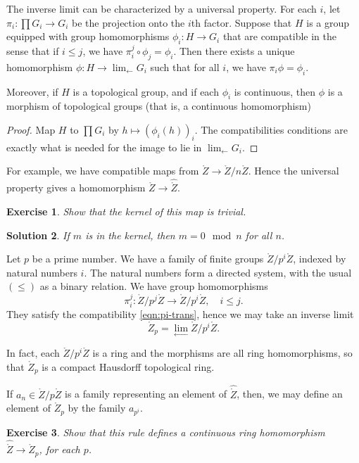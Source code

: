 \documentclass{amsart}
\newtheorem{exercise}{Exercise}
\newtheorem{solution}[exercise]{Solution}
\begin{document}
The inverse limit can be characterized by a universal property.  
For each $i$, let $\pi_i: \prod G_i\to G_i$ be the projection onto the $i$th factor.
Suppose that
$H$ is a group equipped with group homomorphisms $\phi_i:H \to G_i$ that are compatible
in the sense that if $i\le j$, we have $\pi^j_i\circ \phi_j = \phi_i$.  Then
there exists a unique homomorphism $\phi:H\to \lim_{\leftarrow} G_i$ such that
for all $i$, we have $\pi_i\phi = \phi_i$.

Moreover, if $H$ is a topological group, and if each $\phi_i$ is continuous, then
$\phi$ is a morphism of topological groups (that is, a continuous homomorphism)

\begin{proof} Map $H$ to $\prod G_i$ by $h\mapsto (\phi_i(h))_i$.  The
  compatibilities conditions are exactly what is needed for the image
  to lie in $\lim_{\leftarrow} G_i$.
\end{proof}

For example, we have compatible maps from $\ring{Z}\to \ring{Z}/n\ring{Z}$.
Hence the universal property gives a homomorphism
$\ring{Z}\to \hat{\ring{Z}}$.

\begin{exercise}
Show that the kernel of this map is trivial.
\end{exercise}

\begin{solution}  If $m$ is in the kernel, then $m = 0 \mod n$ for all $n$.
\end{solution}



Let $p$ be a prime number.  We have a family of finite groups $\ring{Z}/p^i\ring{Z}$,
indexed by natural numbers $i$.  The natural numbers form a directed system,
with the usual $(\le)$ as a binary relation.  We have group homomorphisms
\[
\pi^j_i:\ring{Z}/p^j\ring{Z} \to \ring{Z}/p^i\ring{Z},\quad i\le j.
\]
They satisfy the compatibility \eqref{eqn:pi-trans}, hence we may take an inverse
limit
\[
\ring{Z}_p = \lim_{\leftarrow} \ring{Z}/p^i\ring{Z}.
\]


In fact, each $\ring{Z}/p^i\ring{Z}$ is a ring and the morphisms are all ring
homomorphisms, so that $\ring{Z}_p$ is a compact Hausdorff topological ring.



If $a_n\in \ring{Z}/p\ring{Z}$ is a family representing an element of $\hat{\ring{Z}}$,
then, we may define an element of $\ring{Z}_p$ by the family
$a_{p^i}$.  

\begin{exercise}  Show that this rule defines a continuous ring homomorphism
$\hat{\ring{Z}}\to\ring{Z}_p$, for each $p$.
\end{exercise}
\end{document}
